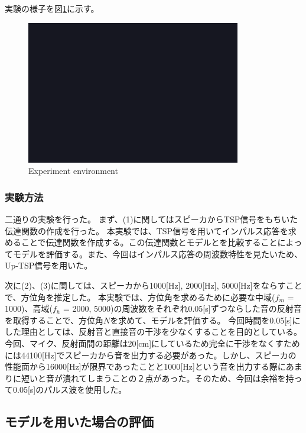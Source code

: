 実験の様子を図\ref{fig:exp_env}に示す。

\begin{figure}[t]
  \begin{center}
  \vspace{1zh}
    \includegraphics[width=0.7\linewidth]{images/fig_sample.png}   
  \end{center}
  \caption{Experiment environment}
  \label{fig:exp_env}
\end{figure}

\subsubsection{実験方法}
二通りの実験を行った。
まず、(1)に関してはスピーカからTSP信号をもちいた伝達関数の作成を行った。
本実験では、TSP信号を用いてインパルス応答を求めることで伝達関数を作成する。この伝達関数とモデルとを比較することによってモデルを評価する。また、今回はインパルス応答の周波数特性を見たいため、Up-TSP信号を用いた。

次に(2)、(3)に関しては、スピーカから1000[Hz], 2000[Hz], 5000[Hz]をならすことで、方位角を推定した。
本実験では、方位角を求めるために必要な中域($f_m$ = 1000)、高域($f_h$ = 2000, 5000)の周波数をそれぞれ0.05[s]ずつならした音の反射音を取得することで、方位角$N$を求めて、モデルを評価する。
今回時間を0.05[s]にした理由としては、反射音と直接音の干渉を少なくすることを目的としている。今回、マイク、反射面間の距離は20[cm]にしているため完全に干渉をなくすためには44100[Hz]でスピーカから音を出力する必要があった。しかし、スピーカの性能面から16000[Hz]が限界であったことと1000[Hz]という音を出力する際にあまりに短いと音が潰れてしまうことの２点があった。そのため、今回は余裕を持って0.05[s]のパルス波を使用した。

\subsection{モデルを用いた場合の評価}
\label{sec:result_model}
